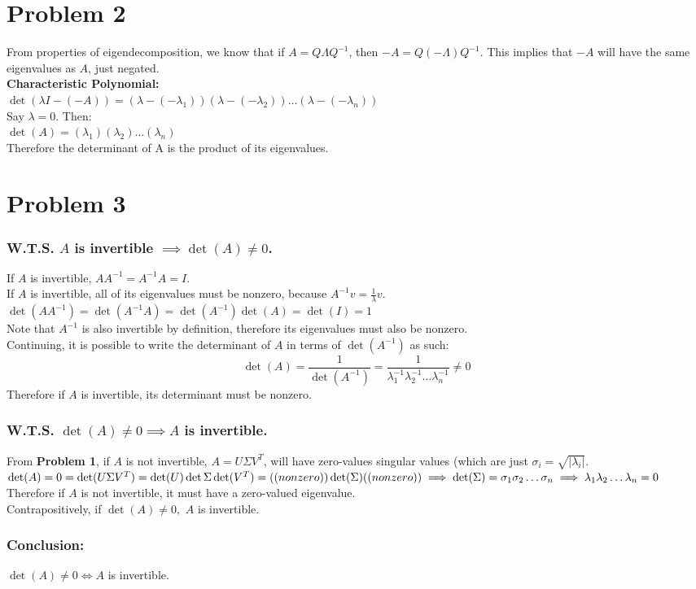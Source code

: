 \documentclass[fleqn]{article}
\begin{document}
\section*{Problem 2}
From properties of eigendecomposition, we know that if $A = Q \Lambda Q^{-1}$, then $-A = Q (-\Lambda)Q^{-1}$.  This implies that $-A$ will have the same eigenvalues as $A$, just negated.\\
\linebreak
\textbf{Characteristic Polynomial:}\\
\linebreak
$\det(\lambda I - (-A)) = (\lambda - (-\lambda_1))(\lambda - (-\lambda_2))\dots(\lambda - (-\lambda_n))$\\
Say $\lambda = 0$.  Then: \\
$\det(A) = (\lambda_1)(\lambda_2)\dots(\lambda_n)$\\
Therefore the determinant of A is the product of its eigenvalues.
\section*{Problem 3}
\subsubsection*{W.T.S. $A$ is invertible $ \implies \det(A) \neq 0$.}
If $A$ is invertible, $AA^{-1}=A^{-1}A=I$.\\
If $A$ is invertible, all of its eigenvalues must be nonzero, because $A^{-1}v=\frac{1}{\lambda}v$. \\
$\det(AA^{-1})=\det(A^{-1}A)=\det(A^{-1})\det(A)=\det(I)=1$\\
Note that $A^{-1}$ is also invertible by definition, therefore its eigenvalues must also be nonzero.\\
Continuing, it is possible to write the determinant of $A$ in terms of $\det(A^{-1})$ as such:
$$\det(A)=\frac{1}{\det(A^{-1})}=\frac{1}{\lambda^{-1}_1\lambda^{-1}_2\dots \lambda^{-1}_n} \neq 0$$
\linebreak
Therefore if $A$ is invertible, its determinant must be nonzero.
\subsubsection*{W.T.S. $\det(A) \neq 0 \implies A$ is invertible.}
From \textbf{Problem 1}, if $A$ is not invertible, $A = U\Sigma V^{T}$, will have zero-values singular values (which are just $\sigma_i = \sqrt{|\lambda_i|}$.\\
$\det(A)= 0 = \det(U\Sigma V^{T})=\det(U)\det{\Sigma}\det(V^{T})=(\text(nonzero))\det(\Sigma)(\text(nonzero))\implies \det(\Sigma) = \sigma_1\sigma_2\dots\sigma_n \implies \lambda_1\lambda_2\dots\lambda_n = 0$\\
Therefore if $A$ is not invertible, it must have a zero-valued eigenvalue.\\
\linebreak
Contrapositively, if $\det(A) \neq 0,$ $A$ is invertible.
\subsubsection*{Conclusion: }
$\det(A) \neq 0 \iff A$ is invertible.

\end{document}
